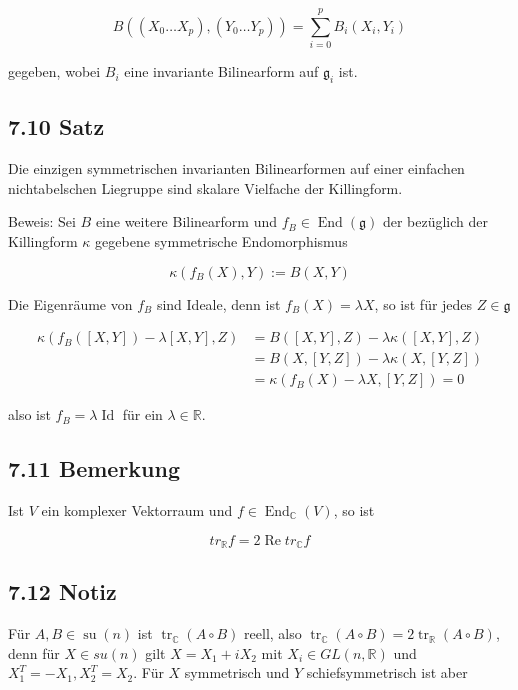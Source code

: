 \documentclass[10pt, letterpaper]{article}
\begin{document}
$$
B\left(\left(X_{0} \ldots X_{p}\right),\left(Y_{0} \ldots Y_{p}\right)\right)=\sum_{i=0}^{p} B_{i}\left(X_{i}, Y_{i}\right)
$$

gegeben, wobei $B_{i}$ eine invariante Bilinearform auf $\mathfrak{g}_{i}$ ist.

\subsection*{7.10 Satz}
Die einzigen symmetrischen invarianten Bilinearformen auf einer einfachen nichtabelschen Liegruppe sind skalare Vielfache der Killingform.

Beweis: Sei $B$ eine weitere Bilinearform und $f_{B} \in \operatorname{End}(\mathfrak{g})$ der bezüglich der Killingform $\kappa$ gegebene symmetrische Endomorphismus

$$
\kappa\left(f_{B}(X), Y\right):=B(X, Y)
$$

Die Eigenräume von $f_{B}$ sind Ideale, denn ist $f_{B}(X)=\lambda X$, so ist für jedes $Z \in \mathfrak{g}$

$$
\begin{aligned}
\kappa\left(f_{B}([X, Y])-\lambda[X, Y], Z\right) & =B([X, Y], Z)-\lambda \kappa([X, Y], Z) \\
& =B(X,[Y, Z])-\lambda \kappa(X,[Y, Z]) \\
& =\kappa\left(f_{B}(X)-\lambda X,[Y, Z]\right)=0
\end{aligned}
$$

also ist $f_{B}=\lambda \operatorname{Id}$ für ein $\lambda \in \mathbb{R}$.

\subsection*{7.11 Bemerkung}
Ist $V$ ein komplexer Vektorraum und $f \in \operatorname{End}_{\mathbb{C}}(V)$, so ist

$$
t r_{\mathbb{R}} f=2 \operatorname{Re} t r_{\mathbb{C}} f
$$

\subsection*{7.12 Notiz}
Für $A, B \in \operatorname{su}(n)$ ist $\operatorname{tr}_{\mathbb{C}}(A \circ B)$ reell, also $\operatorname{tr}_{\mathbb{C}}(A \circ B)=2 \operatorname{tr}_{\mathbb{R}}(A \circ B)$, denn für $X \in s u(n)$ gilt $X=X_{1}+i X_{2}$ mit $X_{i} \in G L(n, \mathbb{R})$ und $X_{1}^{T}=-X_{1}, X_{2}^{T}=X_{2}$. Für $X$ symmetrisch und $Y$ schiefsymmetrisch ist aber
\end{document}
